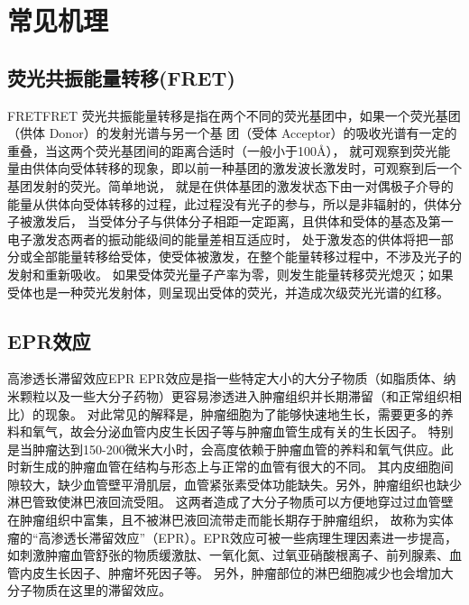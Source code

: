 \documentclass[cn,11pt,chinese]{elegantbook}
\begin{document}
\chapter{常见机理}

\section{荧光共振能量转移(FRET)}

\begin{definition}{FRET}{FRET} 
  荧光共振能量转移是指在两个不同的荧光基团中，如果一个荧光基团（供体 Donor）的发射光谱与另一个基
  团（受体 Acceptor）的吸收光谱有一定的重叠，当这两个荧光基团间的距离合适时（一般小于100Å），
  就可观察到荧光能量由供体向受体转移的现象，即以前一种基团的激发波长激发时，可观察到后一个基团发射的荧光。简单地说，
  就是在供体基团的激发状态下由一对偶极子介导的能量从供体向受体转移的过程，此过程没有光子的参与，所以是非辐射的，供体分子被激发后，
  当受体分子与供体分子相距一定距离，且供体和受体的基态及第一电子激发态两者的振动能级间的能量差相互适应时，
  处于激发态的供体将把一部分或全部能量转移给受体，使受体被激发，在整个能量转移过程中，不涉及光子的发射和重新吸收。
  如果受体荧光量子产率为零，则发生能量转移荧光熄灭；如果受体也是一种荧光发射体，则呈现出受体的荧光，并造成次级荧光光谱的红移。
\end{definition}

\section{EPR效应}

\begin{definition}{高渗透长滞留效应}{EPR} 
  EPR效应是指一些特定大小的大分子物质（如脂质体、纳米颗粒以及一些大分子药物）更容易渗透进入肿瘤组织并长期滞留（和正常组织相比）的现象。
  对此常见的解释是，肿瘤细胞为了能够快速地生长，需要更多的养料和氧气，故会分泌血管内皮生长因子等与肿瘤血管生成有关的生长因子。
  特别是当肿瘤达到150-200微米大小时，会高度依赖于肿瘤血管的养料和氧气供应。此时新生成的肿瘤血管在结构与形态上与正常的血管有很大的不同。
  其内皮细胞间隙较大，缺少血管壁平滑肌层，血管紧张素受体功能缺失。另外，肿瘤组织也缺少淋巴管致使淋巴液回流受阻。
  这两者造成了大分子物质可以方便地穿过过血管壁在肿瘤组织中富集，且不被淋巴液回流带走而能长期存于肿瘤组织，
  故称为实体瘤的“高渗透长滞留效应”（EPR）。EPR效应可被一些病理生理因素进一步提高，
  如刺激肿瘤血管舒张的物质缓激肽、一氧化氮、过氧亚硝酸根离子、前列腺素、血管内皮生长因子、肿瘤坏死因子等。
  另外，肿瘤部位的淋巴细胞减少也会增加大分子物质在这里的滞留效应。
\end{definition}
\end{document}
